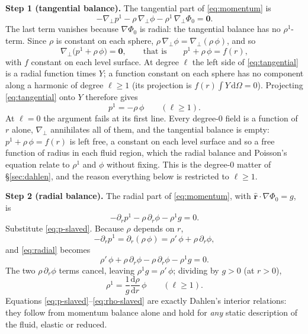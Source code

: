 \documentclass[11pt]{article}
\begin{document}
\textbf{Step 1 (tangential balance).} The tangential part of
\eqref{eq:momentum} is
\begin{equation}
  -\nabla_{\!\perp} p^1 - \rho\,\nabla_{\!\perp}\phi
  - \rho^1\,\nabla_{\!\perp}\Phi_0 = \mathbf 0 .
\end{equation}
The last term vanishes because $\nabla\Phi_0$ is radial: the
tangential balance has no $\rho^1$-term. Since $\rho$ is constant on
each sphere, $\rho\,\nabla_{\!\perp}\phi =
\nabla_{\!\perp}(\rho\,\phi)$, and so
\begin{equation}
  \nabla_{\!\perp}\bigl(p^1 + \rho\,\phi\bigr) = \mathbf 0 ,
  \qquad\text{that is}\qquad
  p^1 + \rho\,\phi = f(r) ,
  \label{eq:tangential}
\end{equation}
with $f$ constant on each level surface. At degree $\ell$ the left side
of \eqref{eq:tangential} is a radial function times $Y$; a function
constant on each sphere has no component along a harmonic of degree
$\ell \ge 1$ (its projection is $f(r)\int Y\,\mathrm{d}\Omega = 0$).
Projecting \eqref{eq:tangential} onto $Y$ therefore gives
\begin{equation}
  p^1 = -\rho\,\phi \qquad (\ell \ge 1).
  \label{eq:p-slaved}
\end{equation}
At $\ell = 0$ the argument fails at its first line. Every degree-0
field is a function of $r$ alone, $\nabla_{\!\perp}$ annihilates all of
them, and the tangential balance is empty: $p^1 + \rho\,\phi = f(r)$
is left free, a constant on each level surface and so a free function
of radius in each fluid region, which the radial balance and Poisson's
equation relate to $\rho^1$ and $\phi$ without fixing. This is the
degree-0 matter of \S\ref{sec:dahlen}, and the reason everything below
is restricted to $\ell \ge 1$.

\textbf{Step 2 (radial balance).} The radial part of
\eqref{eq:momentum}, with $\hat{\mathbf r}\cdot\nabla\Phi_0 = g$, is
\begin{equation}
  -\partial_r p^1 - \rho\,\partial_r\phi - \rho^1 g = 0 .
  \label{eq:radial}
\end{equation}
Substitute \eqref{eq:p-slaved}. Because $\rho$ depends on $r$,
\begin{equation}
  -\partial_r p^1 = \partial_r(\rho\,\phi)
  = \rho'\,\phi + \rho\,\partial_r\phi ,
\end{equation}
and \eqref{eq:radial} becomes
\begin{equation}
  \rho'\,\phi + \rho\,\partial_r\phi - \rho\,\partial_r\phi
  - \rho^1 g = 0 .
\end{equation}
The two $\rho\,\partial_r\phi$ terms cancel, leaving
$\rho^1 g = \rho'\,\phi$; dividing by $g > 0$ (at $r > 0$),
\begin{equation}
  \rho^1 = \frac{1}{g}\frac{\mathrm{d}\rho}{\mathrm{d}r}\,\phi
  \qquad (\ell \ge 1).
  \label{eq:rho-slaved}
\end{equation}
Equations \eqref{eq:p-slaved}--\eqref{eq:rho-slaved} are exactly
Dahlen's interior relations: they follow from momentum balance alone
and hold for \emph{any} static description of the fluid, elastic or
reduced.
\end{document}
